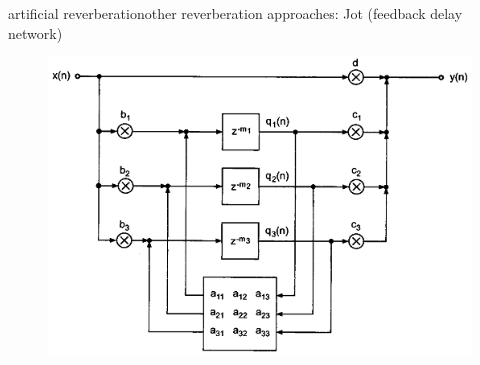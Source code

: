 \begin{frame}{artificial reverberation}{other reverberation approaches: Jot (feedback delay network)}
	\begin{figure}
		\centerline{\includegraphics[scale=.5]{graph/fdn}}
	\end{figure} 
\end{frame}

